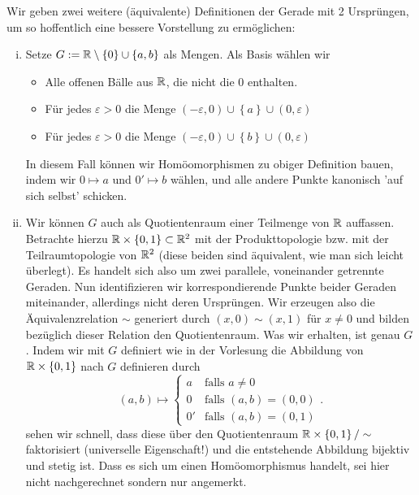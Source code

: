 \begin{remark*}
    Wir geben zwei weitere (äquivalente) Definitionen der Gerade mit 2 Ursprüngen, um so hoffentlich eine bessere Vorstellung zu ermöglichen:
    \begin{enumerate}[i)]
        \item Setze $G:= \mathbb{R}\setminus \left \{0\right\} \cup \left \{a,b\right\} $ als Mengen. Als Basis wählen wir
            \begin{itemize}
                \item Alle offenen Bälle aus $\mathbb{R}$, die nicht die $0$ enthalten.
                \item Für jedes  $ε>0$ die Menge  $(-ε,0)\cup \left \{a\right\} \cup (0,ε)$
                \item Für jedes $ε>0$ die Menge  $(-ε,0)\cup \left \{b\right\} \cup (0,ε)$
            \end{itemize}
        In diesem Fall können wir Homöomorphismen zu obiger Definition bauen, indem wir $0 \mapsto a$ und  $0' \mapsto b$ wählen, und alle andere Punkte kanonisch 'auf sich selbst' schicken.
    \item  Wir können $G$ auch als Quotientenraum einer Teilmenge von  $\mathbb{R}$ auffassen. Betrachte hierzu $\mathbb{R}\times \left \{0,1\right\} \subset \mathbb{R}^2$ mit der Produkttopologie bzw. mit der Teilraumtopologie von $\mathbb{R}^2$ (diese beiden sind äquivalent, wie man sich leicht überlegt). Es handelt sich also um zwei parallele, voneinander getrennte Geraden. Nun identifizieren wir korrespondierende Punkte beider Geraden miteinander, allerdings nicht deren Ursprüngen. Wir erzeugen also die Äquivalenzrelation $\sim $ generiert durch $(x,0) \sim (x,1)$ für $x\neq 0$ und bilden bezüglich dieser Relation den Quotientenraum. Was wir erhalten, ist genau $G$. Indem wir mit  $G$ definiert wie in der Vorlesung die Abbildung von  $\mathbb{R}\times \left \{0,1\right\}$ nach $G$ definieren durch
         \[
             (a,b) \mapsto \begin{cases}
                 a & \text{falls } a\neq 0 \\
                 0 & \text{falls } (a,b) = (0,0) \\
                 0' & \text{falls } (a,b) = (0,1)
             \end{cases}
        .\]
        sehen wir schnell, dass diese über den Quotientenraum $\mathbb{R}\times \left \{0,1\right\} / \sim $ faktorisiert (universelle Eigenschaft!) und die entstehende Abbildung bijektiv und stetig ist. Dass es sich um einen Homöomorphismus handelt, sei hier nicht nachgerechnet sondern nur angemerkt.

\end{enumerate}
\end{remark*}
